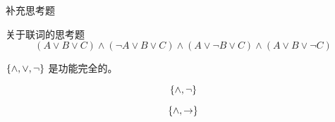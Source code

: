 \begin{frame}{}
  \centerline{\LARGE 补充思考题}
\end{frame}

\begin{frame}{关于联词的思考题}
  \[
    (A \lor B \lor C) \land (\lnot A \lor B \lor C) \land (A \lor \lnot B \lor C) \land (A \lor B \lor \lnot C)
  \]

  \pause
  \begin{theorem}[联词的功能完全性]
    $\{\land, \lor, \lnot\}$ 是功能完全的。
  \end{theorem}

  \pause
  \[
    \{\land, \lnot\}
  \]

  \pause
  \[
    \{\land, \to\}
  \]
\end{frame}

